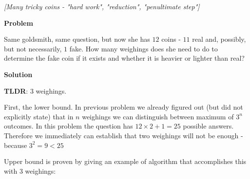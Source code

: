 \begin{problem}
\textit{[Many tricky coins - "hard work", "reduction", "penultimate step"]}

\textbf{Problem}

Same goldsmith, same question, but now she has $12$ coins - $11$ real and, possibly, but not necessarily, $1$ fake.
How many weighings does she need to do to determine the fake coin if it exists and whether it is heavier or lighter than real? 

\textbf{Solution}

\textbf{TLDR}:
$3$ weighings. 

First, the lower bound. In previous problem we already figured out (but did not explicitly state) that in $n$ weighings we can distinguish between maximum of $3^n$ outcomes. In this problem the question has $12\times 2 +1 = 25$ possible answers. Therefore we immediately can establish that two weighings will not be enough - because $3^2=9 <25$

Upper bound is proven by giving an example of algorithm that accomplishes this with $3$ weighings:


\end{problem}

